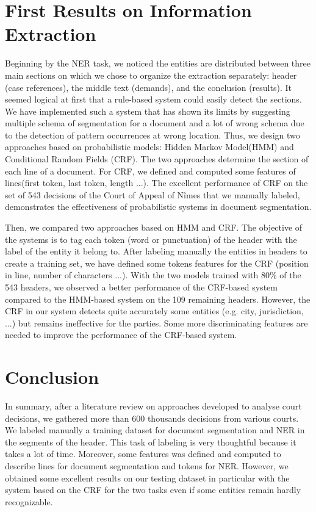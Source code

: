\documentclass[runningheads,a4paper]{llncs}
\begin{document}
\section{First Results on Information Extraction}

Beginning by the NER task, we noticed the entities are distributed between three main sections on which we chose to organize the extraction separately: header (case references), the middle text (demands), and the conclusion (results). It seemed logical at first that a rule-based system could easily detect the sections. We have implemented such a system that has shown its limits by suggesting multiple schema of segmentation for a document and a lot of wrong schema due to the detection of pattern occurrences at wrong location. Thus, we design two approaches based on probabilistic models: Hidden Markov Model(HMM) and Conditional Random Fields (CRF). The two approaches determine the section of each line of a document. For CRF, we defined and computed some features of lines(first token, last token, length ...). The excellent performance of CRF on the set of 543 decisions of the Court of Appeal of Nîmes that we manually labeled, demonstrates the effectiveness of probabilistic systems in document segmentation.

Then, we compared two approaches based on HMM and CRF. The objective of the systems is to tag each token (word or punctuation) of the header with the label of the entity it belong to. After labeling  manually the entities in headers to create a training set, we have defined some tokens features for the CRF (position in line, number of characters ...). With the two models trained with 80\% of the 543 headers, we observed a better performance of the CRF-based system compared to the HMM-based system on the 109 remaining headers. However, the CRF in our system detects quite accurately some entities (e.g. city, jurisdiction, ...) but remains ineffective for the parties. Some more discriminating features are needed to improve the performance of the CRF-based system.

\section{Conclusion}

In summary, after a literature review on approaches developed to analyse court decisions, we gathered more than 600 thousands decisions from various courts. We labeled manually a training dataset  for document segmentation and NER in the segments of the header. This task of labeling is very thoughtful because it takes a lot of time. Moreover, some features was defined and computed to describe lines for document segmentation and tokens for NER. However, we obtained some excellent results on our testing dataset in particular with the system based on the CRF for the two tasks even if some entities remain hardly recognizable.
\end{document}
